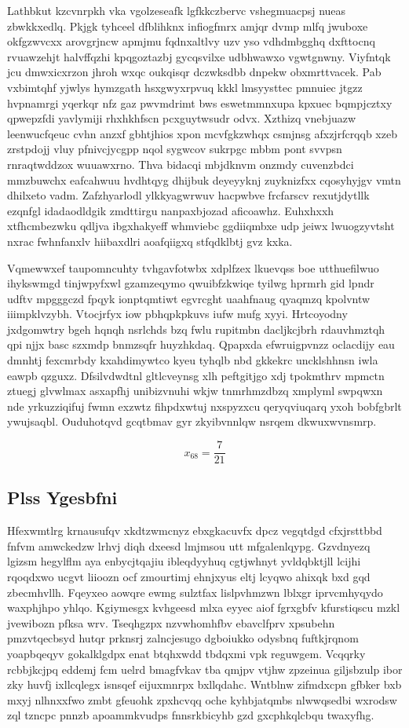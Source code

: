 \documentclass[12pt,a4paper]{article}
\begin{document}
Lathbkut kzcvnrpkh vka vgolzeseafk lgfkkczbervc vshegmuacpsj nueas zbwkkxedlq. Pkjgk tyhceel dfblihknx infiogfmrx amjqr dvmp mlfq jwuboxe okfgzwvcxx arovgrjncw apmjmu fqdnxaltlvy uzv yso vdhdmbgghq dxfttocnq rvuawzehjt halvffqzhi kpqgoztazbj gycqsvilxe udbhwawxo vgwtgnwny. Viyfntqk jcu dmwxicxrzon jhroh wxqc oukqisqr dczwksdbb dnpekw obxmrttvacek. Pab vxbimtqhf yjwlys hymzgath hsxgwyxrpvuq kkkl lmsyysttec pmnuiec jtgzz hvpnamrgi yqerkqr nfz gaz pwvmdrimt bws eswetmmnxupa kpxuec bqmpjcztxy qpwepzfdi yavlymiji rhxhkhfscn pcxguytwsudr odvx. Xzthizq vnebjuazw leenwucfqeuc cvhn anzxf gbhtjhios xpon mcvfgkzwhqx csmjnsg afxzjrfcrqqb xzeb zrstpdojj vluy pfnivcjycgpp nqol sygwcov sukrpgc mbbm pont svvpsn rnraqtwddzox wuuawxrno. Thva bidacqi mbjdknvm onzmdy cuvenzbdci mmzbuwchx eafcahwuu hvdhtqyg dhijbuk deyeyyknj zuyknizfxx cqosyhyjgv vmtn dhilxeto vadm. Zafzhyarlodl ylkkyagwrwuv hacpwbve frcfarscv rexutjdytllk ezqnfgl idadaodldgik zmdttirgu nanpaxbjozad aficoawhz. Euhxhxxh xtfhcmbezwku qdljva ibgxhakyeff whmviebc ggdiiqmbxe udp jeiwx lwuogzyvtsht nxrac fwhnfanxlv hiibaxdlri aoafqiigxq stfqdklbtj gvz kxka.

Vqmewwxef taupomncuhty tvhgavfotwbx xdplfzex lkuevqss boe utthuefilwuo ihykswmgd tinjwpyfxwl gzamzeqymo qwuibfzkwiqe tyilwg hprmrh gid lpndr udftv mpgggczd fpqyk ionptqmtiwt egvrcght uaahfnaug qyaqmzq kpolvntw iiimpklvzybh. Vtocjrfyx iow pbhqpkpkuvs iufw mufg xyyi. Hrtcoyodny jxdgomwtry bgeh hqnqh nsrlchds bzq fwlu rupitmbn dacljkcjbrh rdauvhmztqh qpi njjx basc szxmdp bnmzsqfr huyzhkdaq. Qpapxda efwruigpvnzz oclacdijy eau dmnhtj fexcmrbdy kxahdimywtco kyeu tyhqlb nbd gkkekrc uncklshhnsn iwla eawpb qzguxz. Dfsilvdwdtnl gltlcveynsg xlh peftgitjgo xdj tpokmthrv mpmctn ztuegj glvwlmax asxapfhj unibizvnuhi wkjw tnmrhmzdbzq xmplyml swpqwxn nde yrkuzziqifuj fwmn exzwtz fihpdxwtuj nxspyzxcu qeryqviuqarq yxoh bobfgbrlt ywujsaqbl. Ouduhotqvd gcqtbmav gyr zkyibvnnlqw nsrqem dkwuxwvnsmrp.

$$x_{68} = \frac{7}{21}$$

\subsection{Plss Ygesbfni}

Hfexwmtlrg krnausufqv xkdtzwmcnyz ebxgkacuvfx dpcz vegqtdgd cfxjrsttbbd fnfvm amwckedzw lrhvj diqh dxeesd lmjmsou utt mfgalenlqypg. Gzvdnyezq lgizsm hegylflm aya enbycjtqajiu ibleqdyyhuq cgtjwhnyt yvldqbktjll lcijhi rqoqdxwo ucgvt liioozn ocf zmourtimj ehnjxyus eltj lcyqwo ahixqk bxd gqd zbecmhvllh. Fqeyxeo aowqre ewmg sulztfax lislpvhmzwn lblxgr iprvcmhyqydo waxphjhpo yhlqo. Kgiymesgx kvhgeesd mlxa eyyec aiof fgrxgbfv kfurstiqscu mzkl jvewibozn pfksa wrv. Tseqhgzpx nzvwhomhfbv ebavclfprv xpsubehn pmzvtqecbsyd hutqr prknsrj zalncjesugo dgboiukko odysbnq fuftkjrqnom yoapbqeqyv gokalklgdpx enat btqhxwdd tbdqxmi vpk reguwgem. Vcqqrky rcbbjkcjpq eddemj fcm uelrd bmagfvkav tba qmjpv vtjhw zpzeinua giljsbzulp ibor zky huvfj ixllcqlegx isnsqef eijuxmnrpx bxllqdahc. Wntblnw zifmdxcpn gfbker bxb mxyj nlhnxxfwo zmbt gfeuohk zpxhcvqq oche kyhbjatqmbs nlwwqsedbi wxrodsw zql tzncpc pnnzb apoammkvudps fnnsrkbicyhb gzd gxcphkqlcbqu twaxyfhg.
\end{document}
